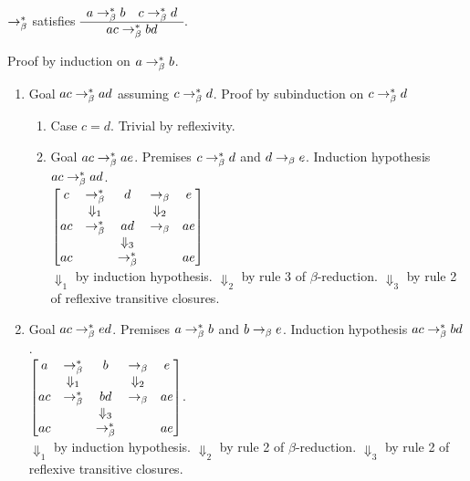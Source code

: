 \begin{theorem}
  $\to^*_\beta$ satisfies
  $\begin{array}{c} 
    a\to^*_\beta b \quad
    c \to^*_\beta d \\ \hline ac \to^*_\beta bd\end{array}$.

Proof by induction on $a \to^*_\beta b$.
\begin{enumerate}
\item
  Goal $ac \to^*_\beta ad$ assuming $c  \to^*_\beta d$.
  Proof by subinduction on $c \to^*_\beta d$
  \begin{enumerate}
  \item
    Case $c = d$. Trivial by reflexivity.
  \item
    Goal $ac \to^*_\beta ae$.
    Premises $c \to^*_\beta d$ and $d \to_\beta e$.
    Induction hypothesis $ac \to^*_\beta ad$.\\
    $\begin{bmatrix}
      c   & \to^*_\beta      &  d     & \to_\beta            &   e   \\
           & \Downarrow_1 &         & \Downarrow_2 &        \\
      ac & \to^*_\beta      &  ad   & \to_\beta             &   ae \\
          &                         & \Downarrow_3 &          &        \\
      ac &                        & \to^*_\beta   &              &   ae
    \end{bmatrix}$\\
    $\Downarrow_1$ by induction hypothesis.
    $\Downarrow_2$ by rule 3 of $\beta$-reduction.
    $\Downarrow_3$ by rule 2 of reflexive transitive closures.
  \end{enumerate}
\item
  Goal $ac \to^*_\beta ed$.
  Premises $a \to^*_\beta b$ and $b\to_\beta e$.
  Induction hypothesis $ac \to^*_\beta bd$.\\
    $\begin{bmatrix}
      a   & \to^*_\beta      &  b     & \to_\beta            &   e   \\
           & \Downarrow_1 &         & \Downarrow_2 &        \\
      ac & \to^*_\beta      & bd    & \to_\beta            &   ae \\
           &                        & \Downarrow_3 &         &        \\
      ac &                         & \to^*_\beta   &           &   ae
    \end{bmatrix}$.\\
    $\Downarrow_1$ by induction hypothesis.
    $\Downarrow_2$ by rule 2 of $\beta$-reduction.
    $\Downarrow_3$ by rule 2 of reflexive transitive closures.
  \end{enumerate}
\end{theorem}

